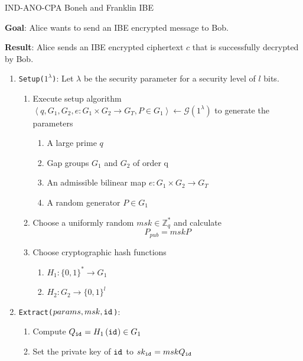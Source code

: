 \begin{algorithm}
\caption{IND-ANO-CPA Boneh and Franklin IBE~\cite{art:BonehF01}}
\label{alg:basic_indent}
\begin{description}
 \item \textbf{Goal}: Alice wants to send an IBE encrypted message to Bob.
 
 \item \textbf{Result}: Alice sends an IBE encrypted ciphertext $c$ that is successfully decrypted by Bob.
\end{description}
 \begin{enumerate}
  \item \texttt{Setup($1^{\lambda}$)}: Let $\lambda$ be the security parameter for a security level of $l$ bits.
  \begin{enumerate}
   \item Execute setup algorithm $\left< q, G_1, G_2, e: G_1 \times G_2 \rightarrow G_T, P \in G_1 \right> \leftarrow \mathcal{G} \left( 1^{\lambda} \right)$ to generate the parameters
    \begin{enumerate}
     \item A large prime $q$
     \item Gap groups $G_1$ and $G_2$ of order q
     \item An admissible bilinear map $e: G_1 \times G_2 \rightarrow G_T$
     \item A random generator $P \in G_1$
   \end{enumerate}
   \item Choose a uniformly random $msk \in \mathbb{Z}^{*}_q$ and calculate
   \begin{equation*}
    P_{pub} = msk P
   \end{equation*}
   \item Choose cryptographic hash functions
    \begin{enumerate}
     \item $H_1: \{ 0,1  \}^* \rightarrow G_1$
     \item $H_2: G_2 \rightarrow \{ 0,1 \}^l$
    \end{enumerate}
  \end{enumerate}
  \item \texttt{Extract($params, msk, \mathtt{id}_{}$)}:
   \begin{enumerate}
    \item Compute $Q_{\mathtt{id}_{}} = H_1 \left( \mathtt{id}_{} \right) \in G_1$
    \item Set the private key of $\mathtt{id}_{}$ to $sk_{\mathtt{id}_{}} = msk Q_{\mathtt{id}_{}}$

\end{enumerate}
\end{enumerate}
\end{algorithm}
